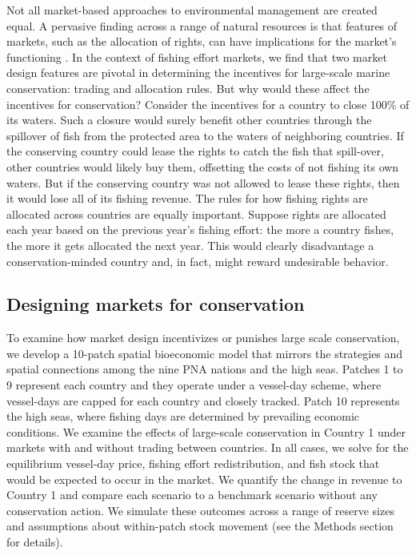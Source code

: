 \documentclass[12pt]{article}
\begin{document}
Not all market-based approaches to environmental management are created equal. A pervasive finding across a range of natural resources is that features of markets, such as the allocation of rights, can have implications for the market's functioning \cite{libecap_1989}. In the context of fishing effort markets, we find that two market design features are pivotal in determining the incentives for large-scale marine conservation: trading and allocation rules. But why would these affect the incentives for conservation? Consider the incentives for a country to close 100\% of its waters. Such a closure would surely benefit other countries through the spillover of fish from the protected area to the waters of neighboring countries. If the conserving country could lease the rights to catch the fish that spill-over, other countries would likely buy them, offsetting the costs of not fishing its own waters. But if the conserving country was not allowed to lease these rights, then it would lose all of its fishing revenue. The rules for how fishing rights are allocated across countries are equally important. Suppose rights are allocated each year based on the previous year's fishing effort: the more a country fishes, the more it gets allocated the next year. This would clearly disadvantage a conservation-minded country and, in fact, might reward undesirable behavior.

\subsection{Designing markets for conservation}

To examine how market design incentivizes or punishes large scale conservation, we develop a 10-patch spatial bioeconomic model that mirrors the strategies and spatial connections among the nine PNA nations and the high seas. Patches 1 to 9 represent each country and they operate under a vessel-day scheme, where vessel-days are capped for each country and closely tracked. Patch 10 represents the high seas, where fishing days are determined by prevailing economic conditions. We examine the effects of large-scale conservation in Country 1 under markets with and without trading between countries. In all cases, we solve for the equilibrium vessel-day price, fishing effort redistribution, and fish stock that would be expected to occur in the market. We quantify the change in revenue to Country 1 and compare each scenario to a benchmark scenario without any conservation action. We simulate these outcomes across a range of reserve sizes and assumptions about within-patch stock movement (see the Methods section for details).
\end{document}
